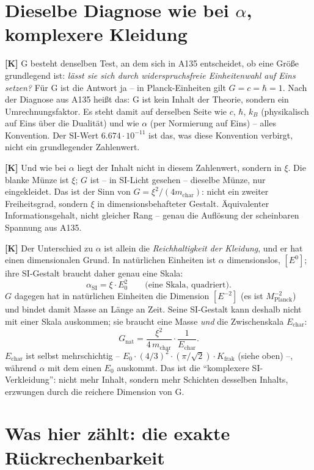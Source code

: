 \section{Dieselbe Diagnose wie bei $\alpha$, komplexere Kleidung}

\textbf{[K]} G besteht denselben Test, an dem sich in A135 entscheidet, ob eine
Größe grundlegend ist: \emph{lässt sie sich durch widerspruchsfreie
Einheitenwahl auf Eins setzen?} Für G ist die Antwort ja -- in Planck-Einheiten
gilt $G = c = \hbar = 1$. Nach der Diagnose aus A135 heißt das: G ist kein
Inhalt der Theorie, sondern ein Umrechnungsfaktor. Es steht damit auf derselben
Seite wie $c$, $\hbar$, $k_B$ (physikalisch auf Eins über die Dualität) und wie
$\alpha$ (per Normierung auf Eins) -- alles Konvention. Der SI-Wert
$6{.}674\cdot10^{-11}$ ist das, was diese Konvention verbirgt, nicht ein
grundlegender Zahlenwert.

\textbf{[K]} Und wie bei $\alpha$ liegt der Inhalt nicht in diesem Zahlenwert,
sondern in $\xi$. Die blanke Münze ist $\xi$; $G$ ist -- in SI-Licht gesehen --
dieselbe Münze, nur eingekleidet. Das ist der Sinn von $G = \xi^2/(4m_\text{char})$:
nicht ein zweiter Freiheitsgrad, sondern $\xi$ in dimensionsbehafteter Gestalt.
Äquivalenter Informationsgehalt, nicht gleicher Rang -- genau die Auflösung der
scheinbaren Spannung aus A135.

\textbf{[K]} Der Unterschied zu $\alpha$ ist allein die \emph{Reichhaltigkeit
der Kleidung}, und er hat einen dimensionalen Grund. In natürlichen Einheiten
ist $\alpha$ dimensionslos, $[E^0]$; ihre SI-Gestalt braucht daher genau eine
Skala:
\[
  \alpha_\text{SI} = \xi\cdot E_0^2 \qquad\text{(eine Skala, quadriert).}
\]
$G$ dagegen hat in natürlichen Einheiten die Dimension $[E^{-2}]$
(es ist $M_\text{Planck}^{-2}$) und bindet damit Masse an Länge an Zeit. Seine
SI-Gestalt kann deshalb nicht mit einer Skala auskommen; sie braucht eine Masse
\emph{und} die Zwischenskala $E_\text{char}$:
\[
  G_\text{nat} = \frac{\xi^2}{4\,m_\text{char}}\cdot\frac{1}{E_\text{char}}.
\]
$E_\text{char}$ ist selbst mehrschichtig -- $E_0\cdot(4/3)^2\cdot(\pi/\sqrt2)\cdot
K_\text{frak}$ (siehe oben) --, während $\alpha$ mit dem einen $E_0$ auskommt.
Das ist die \enquote{komplexere SI-Verkleidung}: nicht mehr Inhalt, sondern mehr
Schichten desselben Inhalts, erzwungen durch die reichere Dimension von G.

\section{Was hier zählt: die exakte Rückrechenbarkeit}

